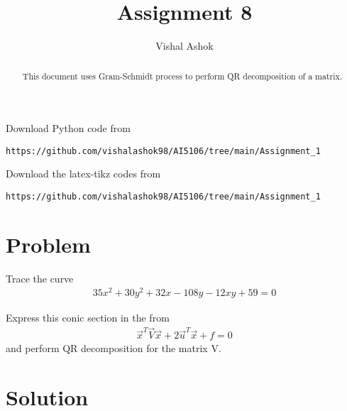 \documentclass[journal,12pt,twocolumn]{IEEEtran}
\begin{document}
\renewcommand{\thefigure}{\theproblem}
\def\putbox#1#2#3{\makebox[0in][l]{\makebox[#1][l]{}\raisebox{\baselineskip}[0in][0in]{\raisebox{#2}[0in][0in]{#3}}}}
     \def\rightbox#1{\makebox[0in][r]{#1}}
     \def\centbox#1{\makebox[0in]{#1}}
     \def\topbox#1{\raisebox{-\baselineskip}[0in][0in]{#1}}
     \def\midbox#1{\raisebox{-0.5\baselineskip}[0in][0in]{#1}}
\vspace{3cm}
\title{Assignment 8}
\author{Vishal Ashok}
\maketitle
\newpage
\bigskip
\renewcommand{\thefigure}{\theenumi}
\renewcommand{\thetable}{\theenumi}
\begin{abstract}
This document uses  Gram-Schmidt process to perform QR decomposition of a matrix.
\end{abstract}
Download Python code from 
%
\begin{lstlisting}
https://github.com/vishalashok98/AI5106/tree/main/Assignment_1
\end{lstlisting}
%
Download the latex-tikz codes from 
%
\begin{lstlisting}
https://github.com/vishalashok98/AI5106/tree/main/Assignment_1
\end{lstlisting}
%

\section{Problem}

Trace the curve
\begin{align}
35x^2+30y^2+32x-108y-12xy+59=0 \label{given_curve_eq}
\end{align}

Express this conic section in the from
\begin{align}
\vec{x}^T\vec{V}\vec{x}+2\vec{u}^T\vec{x}+f=0 \label{conic_quad_eqn}
\end{align} 
and perform QR decomposition for the matrix V.





\section{Solution}
\end{document}

